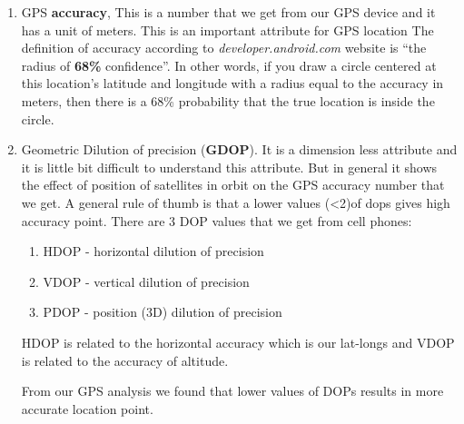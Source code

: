 \documentclass[seminar]{report} \usepackage{longtable} \usepackage{tabu}
\begin{document}

\begin{enumerate}
\item GPS \textbf{accuracy}, This is a number that we get from our GPS device
  and it has a unit of meters. This is an important attribute for GPS location
  The definition of accuracy according to \textit{developer.android.com} website
  is ``the radius of \textbf{68\%} confidence''. In other words, if you draw a
  circle centered at this location's latitude and longitude with a radius equal
  to the accuracy in meters, then there is a 68\% probability that the true
  location is inside the circle.

\item Geometric Dilution of precision (\textbf{GDOP}). It is a dimension less
  attribute and it is little bit difficult to understand this attribute. But in
  general it shows the effect of position of satellites in orbit on the GPS
  accuracy number that we get. A general rule of thumb is that a lower values
  (\textless 2)of dops gives high accuracy point. There are 3 DOP values that we
  get from cell phones:
  \begin{enumerate}
  \item HDOP - horizontal dilution of precision
  \item VDOP - vertical dilution of precision
  \item PDOP - position (3D) dilution of precision
  \end{enumerate}

  HDOP is related to the horizontal accuracy which is our lat-longs and VDOP is
  related to the accuracy of altitude. 

  From our GPS analysis we found that lower values of DOPs results in more
  accurate location point.

\end{enumerate}



\end{document}
